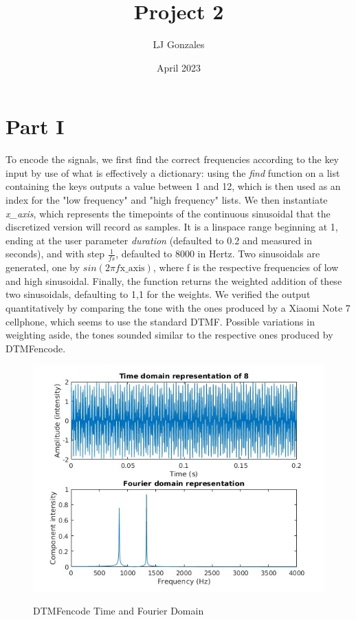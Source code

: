 \documentclass{article}
\title{Project 2}
\author{LJ Gonzales}
\date{April 2023}
\begin{document}
\maketitle
\section{Part I}
To encode the signals, we first find the correct frequencies according to the key input by use of what is effectively a dictionary: using the \emph{find} function on a list containing the keys outputs a value between 1 and 12, which is then used as an index for the "low frequency" and "high frequency" lists. 
We then instantiate \emph{x\_axis}, which represents the timepoints of the continuous sinusoidal that the discretized version will record as samples.
It is a linspace range beginning at 1, ending at the user parameter \emph{duration} (defaulted to 0.2 and measured in seconds), and with step $\frac{1}{fs}$, defaulted to 8000 in Hertz.
Two sinusoidals are generated, one by $sin(2\pi f\text{x\_axis})$, where f is the respective frequencies of low and high sinusoidal.
Finally, the function returns the weighted addition of these two sinusoidals, defaulting to 1,1 for the weights.
We verified the output quantitatively by comparing the tone with the ones produced by a Xiaomi Note 7 cellphone, which seems to use the standard DTMF. Possible variations in weighting aside, the tones sounded similar to the respective ones produced by DTMFencode.
\begin{figure}[h]
	\includegraphics[width =\textwidth]{encode.jpg}
	\label{encode}
	\caption{DTMFencode Time and Fourier Domain}
\end{figure}
\end{document}
